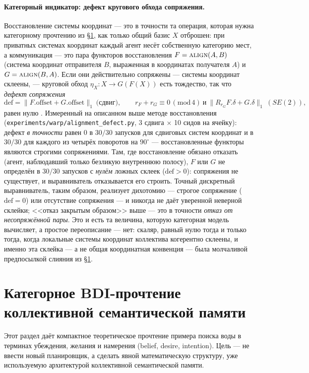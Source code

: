 \documentclass{article}
\begin{document}
\paragraph{Категорный индикатор: дефект кругового обхода сопряжения.}
Восстановление системы координат --- это в точности та операция,
которая нужна категорному прочтению из \S\ref{p4:sec:categorical}, как
только общий базис $X$ отброшен: при приватных системах координат
каждый агент несёт собственную категорию мест, а коммуникация --- это
пара функторов восстановления $F=\textsc{align}(A,B)$ (система
координат отправителя $B$, выраженная в координатах получателя $A$) и
$G=\textsc{align}(B,A)$. Если они действительно сопряжены --- системы
координат склеены, --- круговой обход $\eta_X: X\to G(F(X))$ есть
тождество, так что \emph{дефект сопряжения}
\[
\mathrm{def}=\lVert F.\mathrm{offset}+G.\mathrm{offset}\rVert_1
\ \text{(сдвиг)},\qquad
r_F{+}r_G\equiv 0\,(\mathrm{mod}\,4)\ \text{и}\
\lVert R_{r_G}F.\delta+G.\delta\rVert_1\ (SE(2)),
\]
равен нулю \citep{maclane1998categories}. Измеренный на описанном выше
методе восстановления (\texttt{experiments/warp/alignment\_defect.py},
3 сдвига $\times$ 10 сидов на ячейку): дефект \emph{в точности} равен
$0$ в $30/30$ запусков для сдвиговых систем координат и в $30/30$ для
каждого из четырёх поворотов на $90^\circ$ --- восстановленные функторы
являются строгими сопряжениями. Там, где восстановление обязано
отказать (агент, наблюдавший только безликую внутреннюю полосу), $F$
или $G$ не определён в $30/30$ запусков с \emph{нулём} ложных склеек
($\mathrm{def}>0$): сопряжения не существует, и выравниватель
отказывается его строить. Точный дискретный выравниватель, таким
образом, реализует дихотомию --- строгое сопряжение
($\mathrm{def}{=}0$) или отсутствие сопряжения --- и никогда не даёт
уверенной неверной склейки; <<отказ закрытым образом>> выше --- это в
точности \emph{отказ от несопряжённой пары}. Это и есть та величина,
которую категорная модель вычисляет, а простое переописание --- нет:
скаляр, равный нулю тогда и только тогда, когда локальные системы
координат коллектива когерентно склеены, и именно эта склейка --- а не
общая координатная конвенция --- была молчаливой предпосылкой слияния
из \S\ref{p4:sec:categorical}.

\section{Категорное BDI-прочтение коллективной семантической памяти}
\label{p4:sec:categorical}

Этот раздел даёт компактное теоретическое прочтение примера поиска
воды в терминах убеждения, желания и намерения (belief, desire,
intention). Цель --- не ввести новый планировщик, а сделать явной
математическую структуру, уже используемую архитектурой коллективной
семантической памяти.
\end{document}
